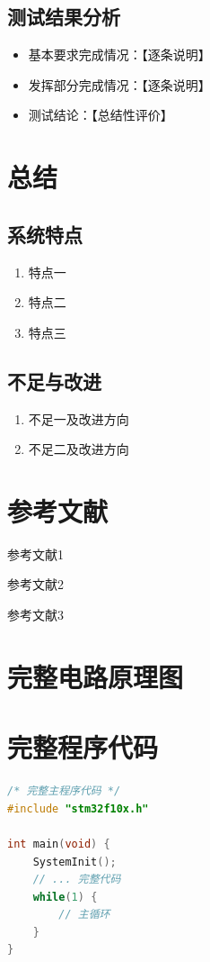 \documentclass[12pt,a4paper]{ctexart}
\begin{document}
\subsection{测试结果分析}

\begin{itemize}
    \item 基本要求完成情况：【逐条说明】
    \item 发挥部分完成情况：【逐条说明】
    \item 测试结论：【总结性评价】
\end{itemize}

\section{总结}

\subsection{系统特点}

\begin{enumerate}
    \item 特点一
    \item 特点二
    \item 特点三
\end{enumerate}

\subsection{不足与改进}

\begin{enumerate}
    \item 不足一及改进方向
    \item 不足二及改进方向
\end{enumerate}

\section*{参考文献}
\begin{enumerate}[label={[\arabic*]}]
    \item 参考文献1
    \item 参考文献2
    \item 参考文献3
\end{enumerate}

\appendix
\section{完整电路原理图}


\section{完整程序代码}

\begin{lstlisting}[language=C, caption={main.c}]
/* 完整主程序代码 */
#include "stm32f10x.h"

int main(void) {
    SystemInit();
    // ... 完整代码
    while(1) {
        // 主循环
    }
}
\end{lstlisting}
\end{document}
